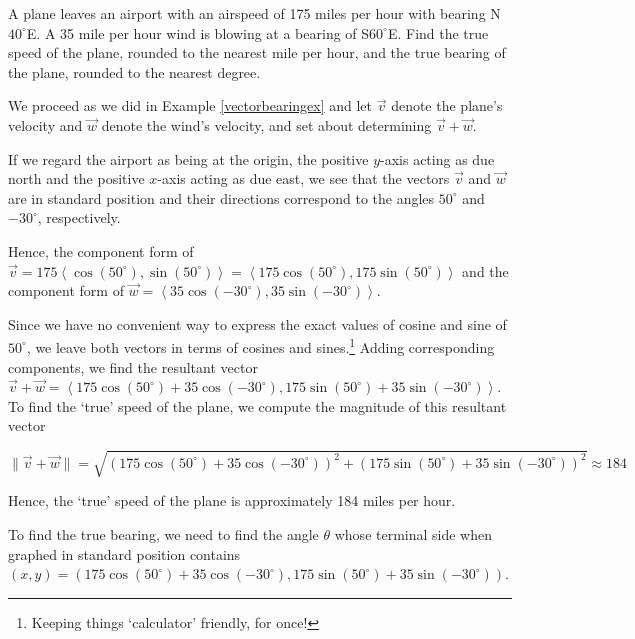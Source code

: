 \documentclass{ximera}
\begin{document}
\begin{example} \label{vectorbearingexresolve}  A plane leaves an airport with an airspeed of 175 miles per hour with bearing N$40^{\circ}$E.  A 35 mile per hour wind is blowing at a bearing of S$60^{\circ}$E.  Find the true speed of the plane, rounded to the nearest mile per hour,  and the true bearing of the plane, rounded to the nearest degree.

\begin{explanation}
We proceed as we did in Example \ref{vectorbearingex} and let $\overrightarrow{v}$ denote the plane's velocity and $\overrightarrow{w}$ denote the wind's velocity, and set about determining $\overrightarrow{v} + \overrightarrow{w}$.  

 

If we regard the airport as being at the origin, the positive $y$-axis acting as due north and the positive $x$-axis acting as due east, we see that the vectors $\overrightarrow{v}$ and $\overrightarrow{w}$ are in standard position and their directions correspond to the angles $50^{\circ}$ and $-30^{\circ}$, respectively.  

 

Hence, the component form of $\overrightarrow{v} = 175\left<\cos(50^{\circ}), \sin(50^{\circ})\right> = \left<175\cos(50^{\circ}), 175\sin(50^{\circ})\right>$ and the component form of $\overrightarrow{w} = \left<35\cos(-30^{\circ}), 35\sin(-30^{\circ}) \right>$.  

 

Since we have no convenient way to express the exact values of cosine and sine of $50^{\circ}$, we leave both vectors in terms of cosines and sines.\footnote{Keeping things `calculator' friendly, for once!}  Adding corresponding components, we find the resultant vector $\overrightarrow{v} + \overrightarrow{w} = \left< 175\cos(50^{\circ}) + 35\cos(-30^{\circ}), 175\sin(50^{\circ}) + 35\sin(-30^{\circ})\right>$.  To find the `true' speed of the plane, we compute the magnitude of this resultant vector

\[ \| \overrightarrow{v} + \overrightarrow{w}\| = \sqrt{ (175\cos(50^{\circ}) + 35\cos(-30^{\circ}))^2 + (175\sin(50^{\circ}) + 35\sin(-30^{\circ}))^2} \approx 184\]

Hence, the `true' speed of the plane is approximately 184 miles per hour. 

 

 To find the true bearing, we need to find the angle $\theta$  whose terminal side when graphed in standard position contains $(x,y) = (175\cos(50^{\circ}) + 35\cos(-30^{\circ}), 175\sin(50^{\circ}) + 35\sin(-30^{\circ}))$.  
 

\end{explanation}
\end{example}
\end{document}
